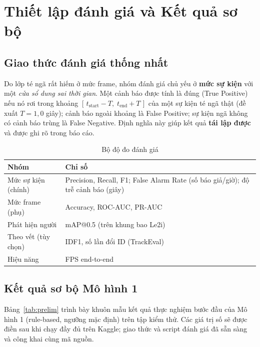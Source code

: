 \documentclass[fontsize=13pt,a4paper,oneside,DIV=calc,chapterprefix=true]{scrbook}
\begin{document}
\chapter{Thiết lập đánh giá và Kết quả sơ bộ}
\label{chap:eval}

\section{Giao thức đánh giá thống nhất}
Do lớp té ngã rất hiếm ở mức frame, nhóm đánh giá chủ yếu ở \textbf{mức sự kiện} với một \emph{cửa sổ dung sai thời gian}. Một cảnh báo được tính là đúng (True Positive) nếu nó rơi trong khoảng $[\,t_{\text{start}} - T,\; t_{\text{end}} + T\,]$ của một sự kiện té ngã thật (đề xuất $T = 1{,}0$ giây); cảnh báo ngoài khoảng là False Positive; sự kiện ngã không có cảnh báo trùng là False Negative. Định nghĩa này giúp kết quả \textbf{tái lập được} và được ghi rõ trong báo cáo.

\begin{table}[H]
\centering
\caption{Bộ độ đo đánh giá}
\label{tab:metrics}
\small
\begin{tabularx}{\linewidth}{@{}p{3.6cm}X@{}}
\toprule
\textbf{Nhóm} & \textbf{Chỉ số} \\
\midrule
Mức sự kiện (chính) & Precision, Recall, F1; False Alarm Rate (số báo giả/giờ); độ trễ cảnh báo (giây) \\
Mức frame (phụ) & Accuracy, ROC-AUC, PR-AUC \\
Phát hiện người & mAP@0.5 (trên khung bao Le2i) \\
Theo vết (tùy chọn) & IDF1, số lần đổi ID (TrackEval) \\
Hiệu năng & FPS end-to-end \\
\bottomrule
\end{tabularx}
\end{table}

\section{Kết quả sơ bộ Mô hình 1}
Bảng~\ref{tab:prelim} trình bày khuôn mẫu kết quả thực nghiệm bước đầu của Mô hình 1 (rule-based, ngưỡng mặc định) trên tập kiểm thử. Các giá trị số sẽ được điền sau khi chạy đầy đủ trên Kaggle; giao thức và script đánh giá đã sẵn sàng và công khai cùng mã nguồn.
\end{document}

